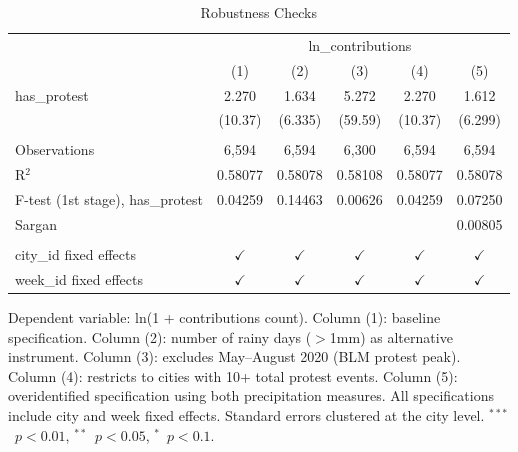 
\begin{table}[htbp]
   \caption{\label{tab:robustness} Robustness Checks}
   \bigskip
   \centering
   \begin{tabular}{lccccc}
      \toprule
       & \multicolumn{5}{c}{ln\_contributions}\\
                                        & (1)           & (2)           & (3)           & (4)           & (5)\\  
      \midrule 
      has\_protest                      & 2.270         & 1.634         & 5.272         & 2.270         & 1.612\\   
                                        & (10.37)       & (6.335)       & (59.59)       & (10.37)       & (6.299)\\   
       \\
      Observations                      & 6,594         & 6,594         & 6,300         & 6,594         & 6,594\\  
      R$^2$                             & 0.58077       & 0.58078       & 0.58108       & 0.58077       & 0.58078\\  
      F-test (1st stage), has\_protest  & 0.04259       & 0.14463       & 0.00626       & 0.04259       & 0.07250\\  
      Sargan                            &               &               &               &               & 0.00805\\  
       \\
      city\_id fixed effects            & $\checkmark$  & $\checkmark$  & $\checkmark$  & $\checkmark$  & $\checkmark$\\   
      week\_id fixed effects            & $\checkmark$  & $\checkmark$  & $\checkmark$  & $\checkmark$  & $\checkmark$\\   
      \bottomrule
   \end{tabular}
   
   \par \raggedright 
   Dependent variable: ln(1 + contributions count). Column (1): baseline specification. Column (2): number of rainy days ($>$1mm) as alternative instrument. Column (3): excludes May--August 2020 (BLM protest peak). Column (4): restricts to cities with 10+ total protest events. Column (5): overidentified specification using both precipitation measures. All specifications include city and week fixed effects. Standard errors clustered at the city level. $^{***}$~$p<0.01$, $^{**}$~$p<0.05$, $^{*}$~$p<0.1$.
\end{table}


